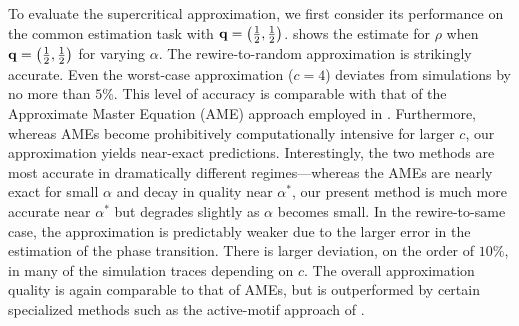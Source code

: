 \documentclass[review, onefignum, onetabnum]{siamart171218}
\newcommand{\pjm}[1]{{\color{blue}[PJM: #1]}}
\newcommand{\pc}[1]{{\color{comment_purple}[PC: #1]}}
\begin{document}
		To evaluate the supercritical approximation, we first consider its performance on the common estimation task with $\mathbf{q} = \left(\frac{1}{2}, \frac{1}{2}\right)$. 
		 shows the estimate for $\rho$ when $\mathbf{q} = \left(\frac{1}{2}, \frac{1}{2}\right)$ for varying $\alpha$. 
		The rewire-to-random approximation is strikingly accurate. 
		Even the worst-case approximation ($c = 4$) deviates from simulations by no more than $5\%$.
		This  level of accuracy is comparable with that of the  Approximate Master Equation (AME) approach employed in \cite{Durrett2012}. %
		Furthermore, whereas AMEs become prohibitively computationally intensive for larger $c$, our approximation yields near-exact predictions. 
		Interestingly, the two methods are most accurate in dramatically different regimes---whereas the AMEs are nearly exact for small $\alpha$ and decay in quality near $\alpha^*$, our present method is much more accurate near $\alpha^*$ but degrades slightly as $\alpha$ becomes small. 
		In the rewire-to-same case, the approximation is predictably weaker due to the larger error in the estimation of the phase transition. 
		There is larger deviation, on the order of $10\%$, in many of the simulation traces depending on $c$. 
		The overall approximation quality is again comparable to that of AMEs, but is outperformed by certain specialized methods such as the active-motif approach of \cite{Demirel2012}. 
		
\end{document}

